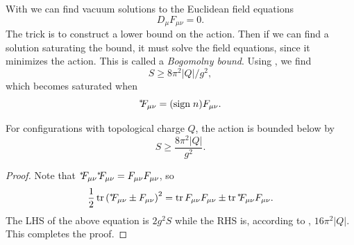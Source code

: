With  we can find vacuum solutions to the Euclidean
field equations
\begin{equation}
  D_\mu F_{\mu\nu}=0.
\end{equation}
The trick is to construct a lower bound on the action. Then if we can
find a solution saturating the bound, it must solve the field equations,
since it minimizes the action. This is called a 
{\it Bogomolny bound}.
Using , we find
\begin{equation}\label{eq:bogo}
  S\geq 8\pi^2|Q|/g^2,
\end{equation}
which becomes saturated when
\begin{equation}\label{eq:efeq}
  {}^{*\hspace{-1mm}}{F_{\mu\nu}}=(\text{sign}\;n)F_{\mu\nu}.
\end{equation}
\begin{proposition}{}{}
For configurations with topological charge $Q$,
the action is bounded below by
$$
  S\geq\frac{8\pi^2|Q|}{g^2}.
$$
  \begin{proof}
    Note that ${}^{*\hspace{-1mm}}{F_{\mu\nu}}{}^{*\hspace{-1mm}}{F_{\mu\nu}}=F_{\mu\nu}F_{\mu\nu}$, so
    $$
      \frac{1}{2}\tr\left(\dual{F_{\mu\nu}\pm F_{\mu\nu}}\right)^2
       =\tr F_{\mu\nu}F_{\mu\nu}\pm\tr\dual{F_{\mu\nu}}F_{\mu\nu}.
    $$
    The LHS of the above equation is $2g^2S$ while the RHS
    is, according to , $16\pi^2|Q|$.
    This completes the proof.
  \end{proof}
\end{proposition}

